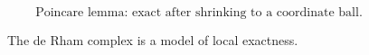 \begin{figure}[htbp]\centering
{}
\[\text{Poincare lemma: exact after shrinking to a coordinate ball.}\]
\caption{The de Rham complex is a model of local exactness.}\end{figure}
